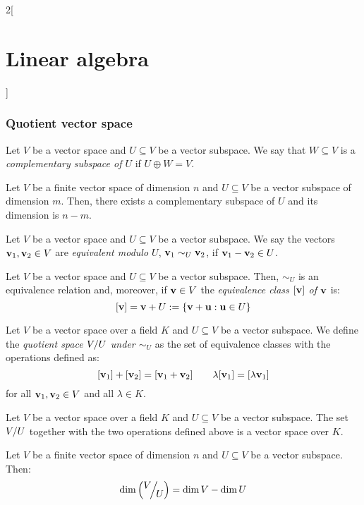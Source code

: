 \documentclass[../../../main.tex]{subfiles}
\begin{document}
\begin{multicols}{2}[\section{Linear algebra}]
  \subsubsection{Quotient vector space}
  \begin{definition}
    Let $V$ be a vector space and $U\subseteq V$ be a vector subspace. We say that $W\subseteq V$ is a \textit{complementary subspace of $U$} if $U\oplus W=V$.
  \end{definition}
  \begin{definition}
    Let $V$ be a finite vector space of dimension $n$ and $U\subseteq V$ be a vector subspace of dimension $m$. Then, there exists a complementary subspace of $U$ and its dimension is $n-m$.
  \end{definition}
  \begin{definition}
    Let $V$ be a vector space and $U\subseteq V$ be a vector subspace. We say the vectors $\boldsymbol{\mathrm{v}}_1,\boldsymbol{\mathrm{v}}_2\in V$ are \textit{equivalent modulo $U$}, $\boldsymbol{\mathrm{v}}_1\sim_U\boldsymbol{\mathrm{v}}_2$, if $\boldsymbol{\mathrm{v}}_1-\boldsymbol{\mathrm{v}}_2\in U$.
  \end{definition}
  \begin{lemma}
    Let $V$ be a vector space and $U\subseteq V$ be a vector subspace. Then, $\sim_U$ is an equivalence relation and, moreover, if $\boldsymbol{\mathrm{v}}\in V$ the \textit{equivalence class $[\boldsymbol{\mathrm{v}}]$ of $\boldsymbol{\mathrm{v}}$} is: $$[\boldsymbol{\mathrm{v}}]=\boldsymbol{\mathrm{v}}+U:=\{\boldsymbol{\mathrm{v}}+\boldsymbol{\mathrm{u}}:\boldsymbol{\mathrm{u}}\in U\}$$
  \end{lemma}
  \begin{definition}
    Let $V$ be a vector space over a field $K$ and $U\subseteq V$ be a vector subspace. We define the \textit{quotient space $\quot{V}{U}$ under $\sim_U$} as the set of equivalence classes with the operations defined as:
    $$[\boldsymbol{\mathrm{v}}_1]+[\boldsymbol{\mathrm{v}}_2]=[\boldsymbol{\mathrm{v}}_1+\boldsymbol{\mathrm{v}}_2]\qquad \lambda[\boldsymbol{\mathrm{v}}_1]=[\lambda\boldsymbol{\mathrm{v}}_1]$$
    for all $\boldsymbol{\mathrm{v}}_1,\boldsymbol{\mathrm{v}}_2\in V$ and all $\lambda\in K$.
  \end{definition}
  \begin{prop}
    Let $V$ be a vector space over a field $K$ and $U\subseteq V$ be a vector subspace. The set $\quot{V}{U}$ together with the two operations defined above is a vector space over $K$.
  \end{prop}
  \begin{prop}
    Let $V$ be a finite vector space of dimension $n$ and $U\subseteq V$ be a vector subspace. Then: $$\dim\left(\quot{V}{U}\right)=\dim V-\dim U$$
  \end{prop}

\end{multicols}
\end{document}

